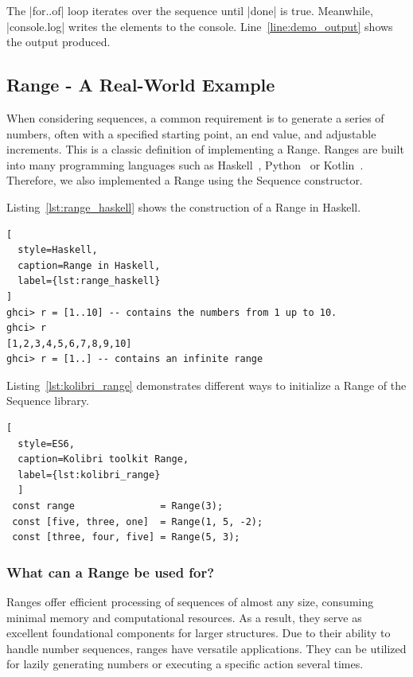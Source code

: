 The |for..of| loop iterates over the sequence until |done| is true. Meanwhile,
|console.log| writes the elements to the console.
Line~\ref{line:demo_output} shows the output produced.


\subsection{Range - A Real-World Example}
\label{sub:Range - A Real-World Example}
When considering sequences, a common requirement is to generate a series of
numbers, often with a specified starting point, an end value, and adjustable
increments. This is a classic definition of implementing a Range.
Ranges are built into many programming languages such as
Haskell~\cite{haskell_list},
Python~\cite{python_range}
or Kotlin~\cite{kotlin_ranges}. Therefore, we also implemented a Range using the Sequence constructor. 

Listing~\ref{lst:range_haskell} shows the construction of a Range in Haskell.
\begin{lstlisting}[
  style=Haskell,
  caption=Range in Haskell,
  label={lst:range_haskell}
]
ghci> r = [1..10] -- contains the numbers from 1 up to 10.
ghci> r
[1,2,3,4,5,6,7,8,9,10]
ghci> r = [1..] -- contains an infinite range
\end{lstlisting}

Listing~\ref{lst:kolibri_range} demonstrates different ways to initialize a
Range of the Sequence library.

\begin{lstlisting}[
  style=ES6, 
  caption=Kolibri toolkit Range,
  label={lst:kolibri_range}
  ]
 const range               = Range(3);
 const [five, three, one]  = Range(1, 5, -2);
 const [three, four, five] = Range(5, 3);
\end{lstlisting}

\subsubsection{What can a Range be used for?}
\label{subsub:What can a Range be used for?}
Ranges offer efficient processing of sequences of almost any size, consuming
minimal memory and computational resources. As a result, they serve as
excellent foundational components for larger structures. Due to their ability
to handle number sequences, ranges have versatile applications. They can be
utilized for lazily generating numbers or executing a specific action several
times.

